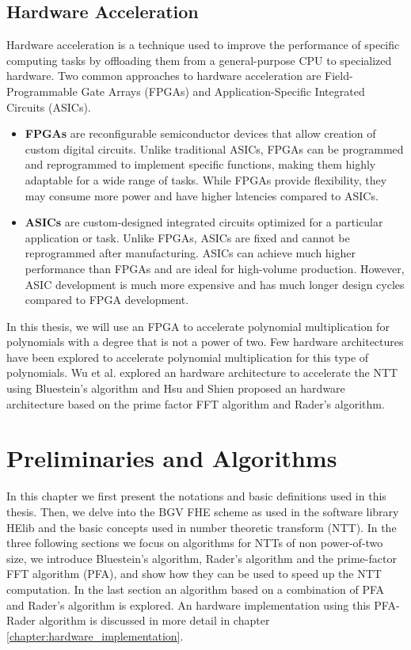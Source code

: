 \documentclass[english,master=eelt,masteroption=ec]{kulemt}
\begin{document}
\FloatBarrier

\section{Hardware Acceleration}

Hardware acceleration is a technique used to improve the performance of specific computing tasks by offloading them from a general-purpose CPU to specialized hardware. Two common approaches to hardware acceleration are Field-Programmable Gate Arrays (FPGAs) and Application-Specific Integrated Circuits (ASICs).

\begin{itemize}
\item{\textbf{FPGAs}}
are reconfigurable semiconductor devices that allow creation of custom digital circuits. Unlike traditional ASICs, FPGAs can be programmed and reprogrammed to implement specific functions, making them highly adaptable for a wide range of tasks. While FPGAs provide flexibility, they may consume more power and have higher latencies compared to ASICs.

\item{\textbf{ASICs}}
are custom-designed integrated circuits optimized for a particular application or task. Unlike FPGAs, ASICs are fixed and cannot be reprogrammed after manufacturing. ASICs can achieve much higher performance than FPGAs and are ideal for high-volume production. However, ASIC development is much more expensive and has much longer design cycles compared to FPGA development.
\end{itemize}

In this thesis, we will use an FPGA to accelerate polynomial multiplication for polynomials with a degree that is not a power of two. Few hardware architectures have been explored to accelerate polynomial multiplication for this type of polynomials. Wu et al. \cite{9937536} explored an hardware architecture to accelerate the NTT using Bluestein's algorithm and Hsu and Shien \cite{9181192} proposed an hardware architecture based on the prime factor FFT algorithm and Rader's algorithm.


\chapter{Preliminaries and Algorithms}

In this chapter we first present the notations and basic definitions used in this thesis. Then, we delve into the BGV FHE scheme as used in the software library HElib and the basic concepts used in number theoretic transform (NTT). In the three following sections we focus on algorithms for NTTs of non power-of-two size, we introduce Bluestein's algorithm, Rader's algorithm and the prime-factor FFT algorithm (PFA), and show how they can be used to speed up the NTT computation. In the last section an algorithm based on a combination of PFA and Rader's algorithm is explored. An hardware implementation using this PFA-Rader algorithm is discussed in more detail in chapter \ref{chapter:hardware_implementation}.
\end{document}
